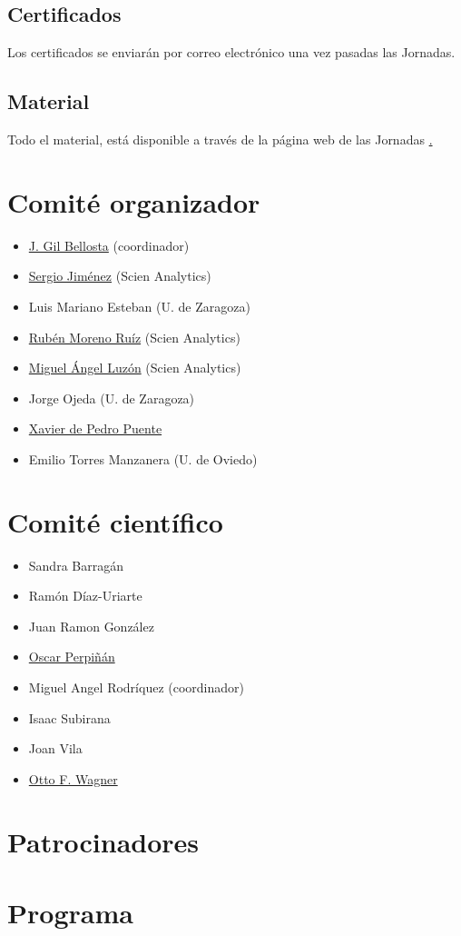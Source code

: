 \section{Certificados}
Los certificados se enviarán por correo electrónico una vez pasadas
las Jornadas.  

\section{Material}

Todo el material, está disponible a través de la página web de las Jornadas 
\href{http://r-es.org/V+Jornadas}. 



\chapter{Comité organizador}

\begin{itemize}

\item \href{http://www.datanalytics.com}{J. Gil Bellosta} (coordinador)
\item \href{http://www.scien-analytics.com}{Sergio Jiménez} (Scien Analytics)
\item Luis Mariano Esteban (U. de Zaragoza)
\item \href{http://www.scien-analytics.com}{Rubén Moreno Ruíz} (Scien Analytics)
\item \href{[http://www.scien-analytics.com}{Miguel Ángel Luzón} (Scien Analytics)
\item Jorge Ojeda (U. de Zaragoza)
\item \href{http://ueb.vhir.org|Vall d'Hebron Research Institute}{Xavier de Pedro Puente}
\item  Emilio Torres Manzanera (U. de Oviedo)
\end{itemize}

\chapter{Comité científico}


\begin{itemize}

\item Sandra Barragán
\item Ramón Díaz-Uriarte
\item Juan Ramon González
\item \href{http://oscarperpinan.github.io}{Oscar Perpiñán}
\item Miguel Angel Rodríquez (coordinador)
\item Isaac Subirana
\item Joan Vila
\item \href{http://www.ottofwagner.es}{Otto F. Wagner}

\end{itemize}


\chapter{Patrocinadores}



\chapter{Programa}

% 

